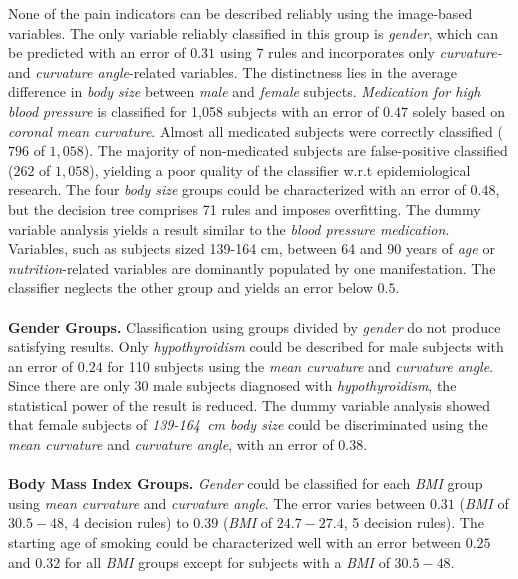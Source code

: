 \documentclass[a4paper,twoside]{style/article}
\begin{document}
None of the pain indicators can be described reliably using the image-based variables.
The only variable reliably classified in this group is \emph{gender}, which can be predicted with an error of $0.31$ using 7 rules and incorporates only \emph{curvature-} and \emph{curvature angle}-related variables.
%
The distinctness lies in the average difference in \emph{body size} between \emph{male} and \emph{female} subjects.
\emph{Medication for high blood pressure} is classified for 1,058 subjects with an error of $0.47$ solely based on \emph{coronal mean curvature}.
Almost all medicated subjects were correctly classified ($796$ of $1,058$).
The majority of non-medicated subjects are false-positive classified ($262$ of $1,058$), yielding a poor quality of the classifier w.r.t epidemiological research.
The four \emph{body size} groups could be characterized with an error of $0.48$, but the decision tree comprises 71 rules and imposes overfitting.
The dummy variable analysis yields a result similar to the \emph{blood pressure medication}.
Variables, such as subjects sized 139-164 cm, between 64 and 90 years of \emph{age} or \emph{nutrition}-related variables are dominantly populated by one manifestation.
The classifier neglects the other group and yields an error below $0.5$.
\\\\
\noindent \textbf{Gender Groups.}
Classification using groups divided by \emph{gender} do not produce satisfying results.
Only \emph{hypothyroidism} could be described for male subjects with an error of $0.24$ for 110 subjects using the \emph{mean curvature} and \emph{curvature angle}.
Since there are only 30 male subjects diagnosed with \emph{hypothyroidism}, the statistical power of the result is reduced.
The dummy variable analysis showed that female subjects of \emph{139-164~cm body size} could be discriminated using the \emph{mean curvature} and \emph{curvature angle}, with an error of $0.38$.
\\\\
\noindent \textbf{Body Mass Index Groups.}
\emph{Gender} could be classified for each \emph{BMI} group using \emph{mean curvature} and \emph{curvature angle}.
The error varies between $0.31$ (\emph{BMI} of \emph{$30.5-48$}, 4 decision rules) to $0.39$ (\emph{BMI} of \emph{$24.7-27.4$}, 5 decision rules).
The starting age of smoking could be characterized well with an error between $0.25$ and $0.32$ for all \emph{BMI} groups except for subjects with a \emph{BMI} of \emph{$30.5-48$}.
\end{document}
